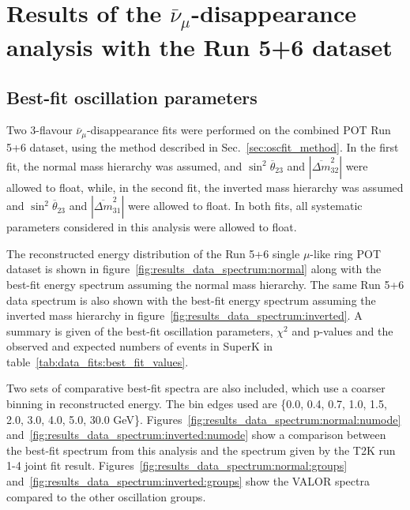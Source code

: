 \clearpage

\section {Results of the $\bar{\nu}_{\mu}$-disappearance analysis with the Run 5+6 dataset}
\label{sec:results}


\subsection {Best-fit oscillation parameters}
\label{sec:results_bestfit}

Two 3-flavour $\bar{\nu}_{\mu}$-disappearance fits were performed on the combined \TotalPot{} 
POT Run 5+6 dataset, using the method described in Sec.~\ref{sec:oscfit_method}.
In the first fit, the normal mass hierarchy was assumed, 
and $\sin^{2}\overline{\theta}_{23}$ and $|\overline{\Delta m}^{2}_{32}|$ were allowed to float, 
while, in the second fit, the inverted mass hierarchy was assumed 
and $\sin^{2}\overline{\theta}_{23}$ and $|\overline{\Delta m}^{2}_{31}|$ were allowed to float. 
In both fits, 
all \NSyst{} systematic parameters considered 
in this analysis were allowed to float. 

The reconstructed energy distribution of the Run 5+6 single $\mu$-like ring \TotalPot{} POT dataset is
shown in figure~\ref{fig:results_data_spectrum:normal} along with the best-fit energy spectrum assuming
the normal mass hierarchy. The same Run 5+6 data spectrum is also shown with the best-fit energy spectrum assuming
the inverted mass hierarchy in figure~\ref{fig:results_data_spectrum:inverted}.
A summary is given of the best-fit oscillation parameters, $\chi^{2}$ and p-values and the observed and 
expected numbers of events in SuperK in table~\ref{tab:data_fits:best_fit_values}.

Two sets of comparative best-fit spectra are also included, which use a coarser binning in reconstructed energy.
The bin edges used are \{0.0, 0.4, 0.7, 1.0, 1.5, 2.0, 3.0, 4.0, 5.0, 30.0 GeV\}.
Figures~\ref{fig:results_data_spectrum:normal:numode} and~\ref{fig:results_data_spectrum:inverted:numode}
show a comparison between the best-fit spectrum from this analysis and the spectrum given by the
T2K run 1-4 joint fit result.
Figures~\ref{fig:results_data_spectrum:normal:groups} and~\ref{fig:results_data_spectrum:inverted:groups}
show the VALOR spectra compared to the other oscillation groups.


